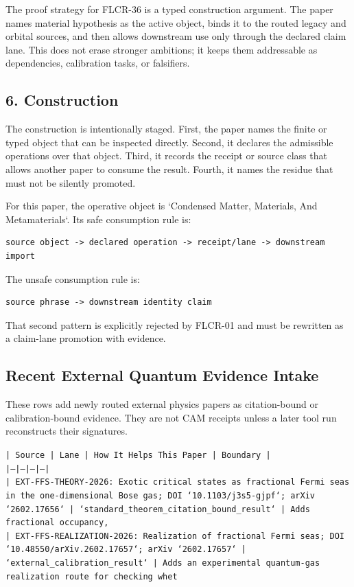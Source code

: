 \documentclass[11pt]{article}
\begin{document}
The proof strategy for FLCR-36 is a typed construction argument. The paper names material hypothesis as the active object, binds it to the routed legacy and orbital sources, and then allows downstream use only through the declared claim lane. This does not erase stronger ambitions; it keeps them addressable as dependencies, calibration tasks, or falsifiers.

\subsection*{6. Construction}

The construction is intentionally staged. First, the paper names the finite or
typed object that can be inspected directly. Second, it declares the admissible
operations over that object. Third, it records the receipt or source class that
allows another paper to consume the result. Fourth, it names the residue that
must not be silently promoted.

For this paper, the operative object is `Condensed Matter, Materials, And Metamaterials`. Its safe consumption
rule is:

\begin{verbatim}
source object -> declared operation -> receipt/lane -> downstream import
\end{verbatim}

The unsafe consumption rule is:

\begin{verbatim}
source phrase -> downstream identity claim
\end{verbatim}

That second pattern is explicitly rejected by FLCR-01 and must be rewritten as
a claim-lane promotion with evidence.

\subsection*{Recent External Quantum Evidence Intake}

These rows add newly routed external physics papers as citation-bound or calibration-bound evidence. They are not CAM receipts unless a later tool run reconstructs their signatures.

\noindent\texttt{| Source | Lane | How It Helps This Paper | Boundary |}\\
\noindent\texttt{|---|---|---|---|}\\
\noindent\texttt{| EXT-FFS-THEORY-2026: Exotic critical states as fractional Fermi seas in the one-dimensional Bose gas; DOI `10.1103/j3s5-gjpf`; arXiv `2602.17656` | `standard\_theorem\_citation\_bound\_result` | Adds fractional occupancy, }\\
\noindent\texttt{| EXT-FFS-REALIZATION-2026: Realization of fractional Fermi seas; DOI `10.48550/arXiv.2602.17657`; arXiv `2602.17657` | `external\_calibration\_result` | Adds an experimental quantum-gas realization route for checking whet}\\
\end{document}
